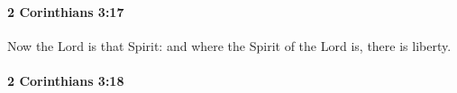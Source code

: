 		\paragraph{2 Corinthians 3:17} %
			\label{2CORINTHIANS-3-17}

			Now the Lord is that Spirit: and where the Spirit of the Lord is, there is liberty.

			\begin{framed}
			\scriptsize
				\begin{compactdesc}
					\item[SBLG] 
				\end{compactdesc}
			\end{framed}

		\paragraph{2 Corinthians 3:18} %
			\label{2CORINTHIANS-3-18}

